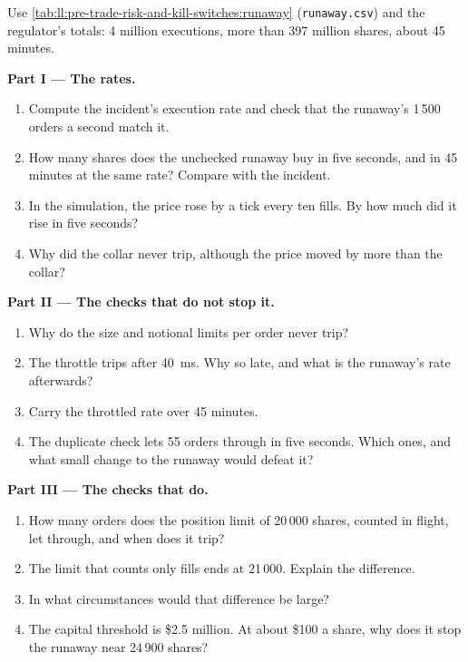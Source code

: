 \begin{problem}\label{pb:ll:pre-trade-risk-and-kill-switches:1}
Use \cref{tab:ll:pre-trade-risk-and-kill-switches:runaway} (\texttt{runaway.csv}) and the regulator's totals: 4 million
executions, more than 397 million shares, about 45 minutes.

\medskip\noindent\textbf{Part I --- The rates.}
\begin{enumerate}
\item Compute the incident's execution rate and check that the runaway's 1\,500 orders a second match it.
\item How many shares does the unchecked runaway buy in five seconds, and in 45 minutes at the same rate? Compare with the
incident.
\item In the simulation, the price rose by a tick every ten fills. By how much did it rise in five seconds?
\item Why did the collar never trip, although the price moved by more than the collar?
\end{enumerate}

\medskip\noindent\textbf{Part II --- The checks that do not stop it.}
\begin{enumerate}[resume]
\item Why do the size and notional limits per order never trip?
\item The throttle trips after \qty{40}{\milli\second}. Why so late, and what is the runaway's rate afterwards?
\item Carry the throttled rate over 45 minutes.
\item The duplicate check lets 55 orders through in five seconds. Which ones, and what small change to the runaway would defeat
it?
\end{enumerate}

\medskip\noindent\textbf{Part III --- The checks that do.}
\begin{enumerate}[resume]
\item How many orders does the position limit of 20\,000 shares, counted in flight, let through, and when does it trip?
\item The limit that counts only fills ends at 21\,000. Explain the difference.
\item In what circumstances would that difference be large?
\item The capital threshold is \$2.5 million. At about \$100 a share, why does it stop the runaway near 24\,900 shares?
\end{enumerate}


\end{problem}
